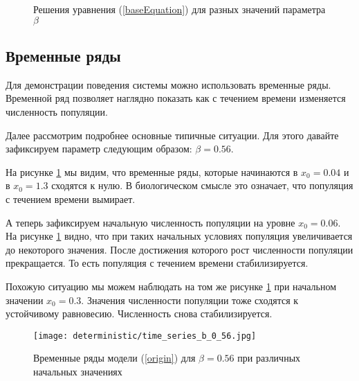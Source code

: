         \begin{figure}
            \centering



            \captionsetup{justification=centering}
            \caption{Решения уравнения (\ref{baseEquation}) для разных значений параметра \(\beta\)}
        \end{figure}
        
    \subsection{Временные ряды}

        Для демонстрации поведения системы можно использовать временные ряды. Временной ряд позволяет наглядно показать как с течением времени изменяется численность популяции.

        Далее рассмотрим подробнее основные типичные ситуации. Для этого давайте зафиксируем параметр следующим образом: \(\beta = 0.56\). 

        На рисунке \ref{time_series_b_0_56} мы видим, что временные ряды, которые начинаются в \(x_0 = 0.04\) и в \(x_0 = 1.3\) сходятся к нулю. В биологическом смысле это означает, что популяция с течением времени вымирает.

        А теперь зафиксируем начальную численность популяции на уровне \(x_0 = 0.06\). На рисунке \ref{time_series_b_0_56} видно, что при таких начальных условиях популяция увеличивается до некоторого значения. После достижения которого рост численности популяции прекращается. То есть популяция с течением времени стабилизируется.

        Похожую ситуацию мы можем наблюдать на том же рисунке \ref{time_series_b_0_56} при начальном значении \(x_0 = 0.3\). Значения численности популяции тоже сходятся к устойчивому равновесию. Численность снова стабилизируется.
    
        \begin{figure}
            \centering
            \texttt{[image: deterministic/time\_series\_b\_0\_56.jpg]}

            \captionsetup{justification=centering}
            \caption{Временные ряды модели (\ref{origin}) для \(\beta = 0.56\) при различных начальных значениях}
            \label{time_series_b_0_56}
        \end{figure}

